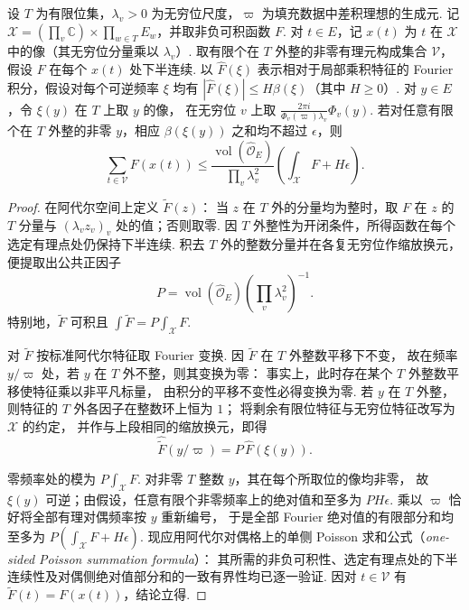 \begin{lemma}
\label{lem:b-poisson-transfer}
\emitthmsource
设 $T$ 为有限位集，$\lambda_v>0$ 为无穷位尺度，$\varpi$ 为填充数据中差积理想的生成元.
记 $\mathcal X=(\prod_v\mathbb C)\times\prod_{w\in T}E_w$，并取非负可积函数 $F$.
对 $t\in E$，记 $x(t)$ 为 $t$ 在 $\mathcal X$ 中的像（其无穷位分量乘以 $\lambda_v$）.
取有限个在 $T$ 外整的非零有理元构成集合 $\mathcal V$，假设 $F$ 在每个 $x(t)$ 处下半连续.
以 $\widehat F(\xi)$ 表示相对于局部乘积特征的 Fourier 积分，假设对每个可逆频率 $\xi$ 均有
$|\widehat F(\xi)|\le H\beta(\xi)$（其中 $H\ge0$）.
对 $y\in E$，令 $\xi(y)$ 在 $T$ 上取 $y$ 的像，
在无穷位 $v$ 上取 $\frac{2\pi i}{\Phi_v(\varpi)\lambda_v}\Phi_v(y)$.
若对任意有限个在 $T$ 外整的非零 $y$，相应 $\beta(\xi(y))$ 之和均不超过 $\epsilon$，则
\[
 \sum_{t\in\mathcal V} F(x(t))
  \le \frac{\operatorname{vol}(\widehat{\mathcal O}_E)}
              {\prod_v\lambda_v^2}\left(\int_{\mathcal X}F+H\epsilon\right).
\]
\end{lemma}
\begin{proof}
在阿代尔空间上定义 $\widetilde F(z)$：
当 $z$ 在 $T$ 外的分量均为整时，取 $F$ 在 $z$ 的 $T$ 分量与
$(\lambda_v z_v)_v$ 处的值；否则取零.
因 $T$ 外整性为开闭条件，所得函数在每个选定有理点处仍保持下半连续.
积去 $T$ 外的整数分量并在各复无穷位作缩放换元，便提取出公共正因子
\[
 P=\operatorname{vol}(\widehat{\mathcal O}_E)\left(\prod_v\lambda_v^2\right)^{-1}.
\]
特别地，$\widetilde F$ 可积且 $\int\widetilde F=P\int_{\mathcal X}F$.

对 $\widetilde F$ 按标准阿代尔特征取 Fourier 变换.
因 $\widetilde F$ 在 $T$ 外整数平移下不变，
故在频率 $y/\varpi$ 处，若 $y$ 在 $T$ 外不整，则其变换为零：
事实上，此时存在某个 $T$ 外整数平移使特征乘以非平凡标量，
由积分的平移不变性必得变换为零.
若 $y$ 在 $T$ 外整，则特征的 $T$ 外各因子在整数环上恒为 $1$；
将剩余有限位特征与无穷位特征改写为 $\mathcal X$ 的约定，
并作与上段相同的缩放换元，即得
\[
 \widehat{\widetilde F}(y/\varpi)=P\,\widehat F(\xi(y)).
\]

零频率处的模为 $P\int_{\mathcal X}F$.
对非零 $T$ 整数 $y$，其在每个所取位的像均非零，
故 $\xi(y)$ 可逆；由假设，任意有限个非零频率上的绝对值和至多为
$PH\epsilon$. 乘以 $\varpi$ 恰好将全部有理对偶频率按 $y$ 重新编号，
于是全部 Fourier 绝对值的有限部分和均至多为
$P(\int_{\mathcal X}F+H\epsilon)$.
现应用阿代尔对偶格上的单侧 Poisson 求和公式（\emph{one-sided Poisson summation formula}）：
其所需的非负可积性、选定有理点处的下半连续性及对偶侧绝对值部分和的一致有界性均已逐一验证.
因对 $t\in\mathcal V$ 有 $\widetilde F(t)=F(x(t))$，结论立得.
\end{proof}


